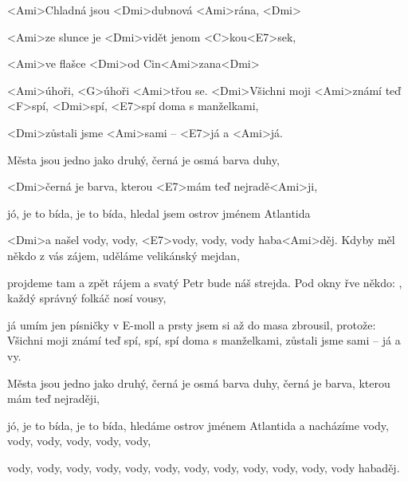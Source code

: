 
\zs
<Ami>Chladná jsou <Dmi>dubnová <Ami>rána, <Dmi>

<Ami>ze slunce je <Dmi>vidět jenom <C>kou<E7>sek,

<Ami>ve flašce <Dmi>od Cin<Ami>zana<Dmi> 

<Ami>úhoři, <G>úhoři <Ami>třou se.
\ks
\zr
<Dmi>Všichni moji <Ami>známí teď <F>spí, <Dmi>spí, 
<E7>spí doma s manželkami,

<Dmi>zůstali jsme <Ami>sami – <E7>já a <Ami>já.

Města jsou jedno jako druhý, černá je osmá barva duhy,

<Dmi>černá je barva, kterou <E7>mám teď nejradě<Ami>ji,

jó, je to bída, je to bída, hledal jsem ostrov jménem Atlantida

<Dmi>a našel vody, vody, <E7>vody, vody, vody haba<Ami>děj.
\kr
\zs
Kdyby měl někdo z vás zájem,
uděláme velikánský mejdan,

projdeme tam a zpět rájem
a svatý Petr bude náš strejda.
\ks
\zr \kr
\zs
Pod okny řve někdo: ,
každý správný folkáč nosí vousy,

já umím jen písničky v E-moll
a prsty jsem si až do masa zbrousil, protože:
\ks
\zr
Všichni moji známí teď spí, spí, spí doma s manželkami,
zůstali jsme sami -- já a vy.

Města jsou jedno jako druhý, černá je osmá barva duhy,
černá je barva, kterou mám teď nejraději,

jó, je to bída, je to bída, hledáme ostrov jménem Atlantida
a nacházíme vody, vody, vody, vody, vody, vody,

vody, vody, vody, vody, vody, vody,
vody, vody, vody, vody, vody, vody habaděj.
\kr
\kp







